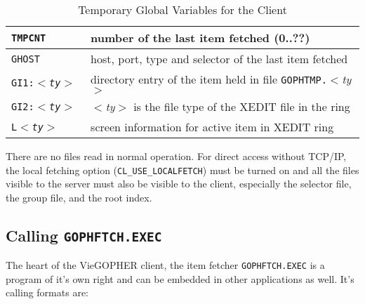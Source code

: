 \begin{table}
\caption{Temporary Global Variables for the Client}\label{clglv-t}
\rule{0mm}{2mm}
\begin{center}
\begin{minipage}{\textwidth}
\begin{tabular}{|l|l|}\hline 
{\tt  TMPCNT     } & number of the last item fetched (0..??)\\
\hline
{\tt  GHOST      } & host, port, type and selector of the last item fetched\\
\hline
{\tt  GI1:{\sl{$<$ty$>$}}  } &  directory entry of the item held in 
                                file {\tt GOPHTMP.}{\sl{$<$ty$>$}}\\
{\tt  GI2:{\sl{$<$ty$>$}}  } &  {\sl $<$ty$>$} is the file type of the
                                XEDIT file in the ring\\ \hline
{\tt  L{\sl{$<$ty$>$}}     } &  screen information for active item in
                                XEDIT ring\\ 
\hline
\end{tabular}
\end{minipage}
\end{center}
\end{table}

\rule{0mm}{5mm}





  There are no files read in normal operation.  For direct access without
  TCP/IP, the local fetching option ({\tt CL\_USE\_LOCALFETCH}) must be
  turned on and all the files visible to the server must also be visible
  to the client, especially the selector file, the group file, and the
  root index.
 


\subsection{Calling {\tt GOPHFTCH.EXEC}}

The heart of the VieGOPHER client, the item fetcher {\tt GOPHFTCH.EXEC}
is a program of it's own right and can be embedded in other applications
as well.  It's calling formats are:\\
\rule{0mm}{1mm}

